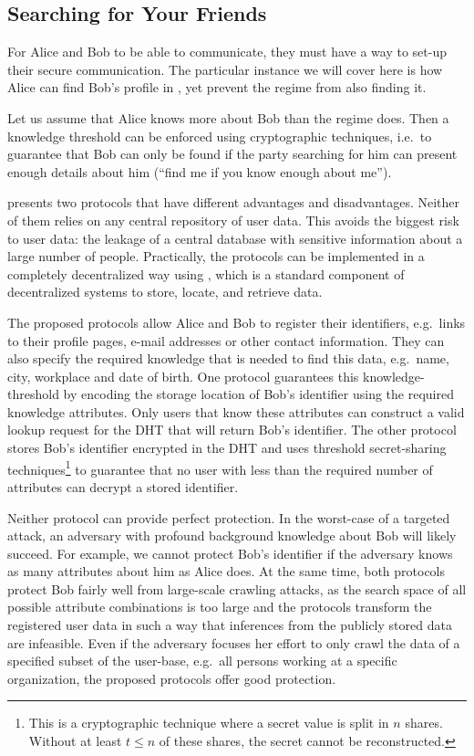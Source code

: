 \subsection{Searching for Your Friends}
\label{UserSearch}

For Alice and Bob to be able to communicate, they must have a way to set-up 
their secure communication.
The particular instance we will cover here is how Alice can find Bob's profile 
in , yet prevent the regime from also finding it.

Let us assume that Alice knows more about Bob than the regime does.
Then a knowledge threshold can be enforced using cryptographic techniques, 
i.e.\ to guarantee that Bob can only be found if the party searching for him 
can present enough details about him (\enquote{find me if you know enough about
me}).

\Textcite{ThresholdUserSearch} presents two protocols that have different 
advantages and disadvantages.
Neither of them relies on any central repository of user data.
This avoids the biggest risk to user data: the leakage of a central database 
with sensitive information about a large number of people.
Practically, the protocols can be implemented in a completely decentralized way 
using , which is a standard component of
decentralized systems to store, locate, and retrieve data.

The proposed protocols allow Alice and Bob to register their identifiers, e.g.\ 
links to their profile pages, e-mail addresses or other contact information.
They can also specify the required knowledge that is needed to find this data,  
e.g.\ name, city, workplace and date of birth.
One protocol guarantees this knowledge-threshold by encoding the storage 
location of Bob's identifier using the required knowledge attributes.
Only users that know these attributes can construct a valid lookup request for 
the \ac{DHT} that will return Bob's identifier.
The other protocol stores Bob's identifier encrypted in the \ac{DHT} and uses 
threshold secret-sharing techniques\footnote{%
  This is a cryptographic technique where a secret value is split in \(n\) 
  shares.
  Without at least \(t\leq n\) of these shares, the secret cannot be 
  reconstructed.
} to guarantee that no user with less than the required number of attributes 
can decrypt a stored identifier.

Neither protocol can provide perfect protection.
In the worst-case of a targeted attack, an adversary with profound background 
knowledge about Bob will likely succeed.
For example, we cannot protect Bob's identifier if the adversary knows as many 
attributes about him as Alice does.
At the same time, both protocols protect Bob fairly well from large-scale 
crawling attacks, as the search space of all possible attribute combinations is 
too large and the protocols transform the registered user data in such a way 
that inferences from the publicly stored data are infeasible.
Even if the adversary focuses her effort to only crawl the data of a specified 
subset of the user-base, e.g.\ all persons working at a specific organization, 
the proposed protocols offer good protection. 

